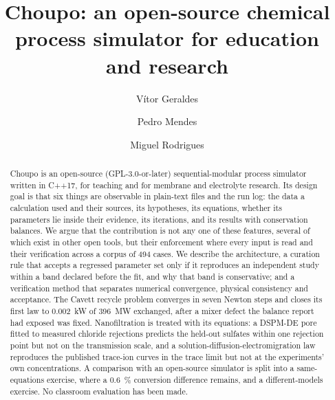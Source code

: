 \documentclass[preprint,12pt]{elsarticle}
\begin{document}
\begin{frontmatter}

\title{Choupo: an open-source chemical process simulator for education and
research}

\author[inst1]{Vítor Geraldes}
\author[inst1]{Pedro Mendes}
\author[inst1]{Miguel Rodrigues}

\begin{abstract}
Choupo is an open-source (GPL-3.0-or-later) sequential-modular process
simulator written in C++17, for teaching and for membrane and electrolyte
research.  Its design goal is that six things are observable in
plain-text files and the run log: the data a calculation used and their
sources, its hypotheses, its equations, whether its parameters lie inside
their evidence, its iterations, and its results with conservation
balances.  We argue that the contribution is not any one of these
features, several of which exist in other open tools, but their
enforcement where every input is read and their verification across a
corpus of 494 cases.  We describe the architecture, a curation rule that
accepts a regressed parameter set only if it reproduces an independent
study within a band declared before the fit, and why that band is
conservative; and a verification method that separates numerical
convergence, physical consistency and acceptance.  The Cavett recycle
problem converges in seven Newton steps and closes its first law to
0.002~kW of 396~MW exchanged, after a mixer defect the balance report had
exposed was fixed.  Nanofiltration is treated with its equations: a
DSPM-DE pore fitted to measured chloride rejections predicts the
held-out sulfates within one rejection point but not on the transmission
scale, and a
solution-diffusion-electromigration law reproduces the published trace-ion
curves in the trace limit but not at the experiments' own concentrations.
A comparison with an open-source simulator is split into a same-equations
exercise, where a 0.6~\% conversion difference remains, and a
different-models exercise.  No classroom evaluation has been made.
\end{abstract}


\end{frontmatter}
\end{document}
